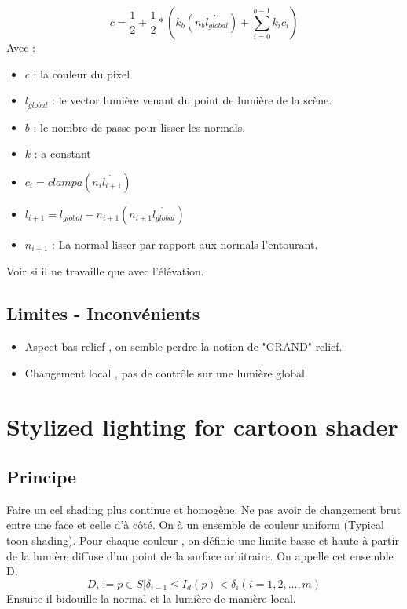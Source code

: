 \documentclass[a4paper]{article}
\begin{document}
\[c = \frac{1}{2}+ \frac{1}{2}  * \left( k_b ( n_b\dot{l_{global}}) + \sum_{i=0}^{b-1}k_i c_i \right)\]
Avec : \\
\begin{itemize}
\item $c$ : la couleur du pixel
\item $l_{global}$ : le vector lumière venant du point de lumière de la scène.
\item $b$ : le nombre de passe pour lisser les normals.
\item $k$ : a constant
\item $c_{i} = clamp a(n_i\dot{l_{i+1}})$
\item $l_{i+1} = l_{global} - n_{i+1}(n_{i+1}\dot{l_{global}}) $
\item $n_{i+1}$ : La normal lisser par rapport aux normals l'entourant.
\end{itemize}


Voir si il ne travaille que avec l'élévation. 


\subsection{Limites - Inconvénients}
\begin{itemize}
\item Aspect bas relief , on semble perdre la notion de "GRAND" relief. 
\item Changement local , pas de contrôle sur une lumière global.
\end{itemize}




\section{Stylized lighting for cartoon shader}
\subsection{Principe}
Faire un cel shading plus continue et homogène. Ne pas avoir de changement brut entre une face et celle d'à côté.  
On à un ensemble de couleur uniform (Typical toon shading). Pour chaque couleur , on définie une limite basse et haute à partir de la lumière diffuse d'un point de la surface arbitraire. On appelle cet ensemble D. 
\[ D_i := {p \in S | \delta_{i-1} \leq I_d(p) < \delta_i} (i=1,2,...,m)\]
Ensuite il bidouille la normal et la lumière de manière local. 
\end{document}
